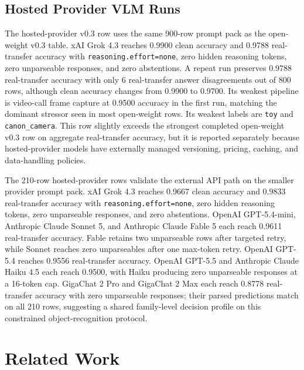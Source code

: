 \documentclass[10pt]{article}
\begin{document}
\subsection{Hosted Provider VLM Runs}



The hosted-provider v0.3 row uses the same 900-row prompt pack as the open-weight v0.3 table. xAI Grok 4.3 reaches 0.9900 clean accuracy and 0.9788 real-transfer accuracy with \texttt{reasoning.effort=none}, zero hidden reasoning tokens, zero unparseable responses, and zero abstentions. A repeat run preserves 0.9788 real-transfer accuracy with only 6 real-transfer answer disagreements out of 800 rows, although clean accuracy changes from 0.9900 to 0.9700. Its weakest pipeline is video-call frame capture at 0.9500 accuracy in the first run, matching the dominant stressor seen in most open-weight rows. Its weakest labels are \texttt{toy} and \texttt{canon\_camera}. This row slightly exceeds the strongest completed open-weight v0.3 row on aggregate real-transfer accuracy, but it is reported separately because hosted-provider models have externally managed versioning, pricing, caching, and data-handling policies.



The 210-row hosted-provider rows validate the external API path on the smaller provider prompt pack. xAI Grok 4.3 reaches 0.9667 clean accuracy and 0.9833 real-transfer accuracy with \texttt{reasoning.effort=none}, zero hidden reasoning tokens, zero unparseable responses, and zero abstentions. OpenAI GPT-5.4-mini, Anthropic Claude Sonnet 5, and Anthropic Claude Fable 5 each reach 0.9611 real-transfer accuracy. Fable retains two unparseable rows after targeted retry, while Sonnet reaches zero unparseables after one max-token retry. OpenAI GPT-5.4 reaches 0.9556 real-transfer accuracy. OpenAI GPT-5.5 and Anthropic Claude Haiku 4.5 each reach 0.9500, with Haiku producing zero unparseable responses at a 16-token cap. GigaChat 2 Pro and GigaChat 2 Max each reach 0.8778 real-transfer accuracy with zero unparseable responses; their parsed predictions match on all 210 rows, suggesting a shared family-level decision profile on this constrained object-recognition protocol.

\section{Related Work}
\end{document}
